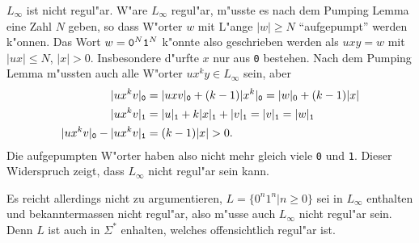 \begin{loesung}
\begin{teilaufgaben}
\item $L_\infty$ ist nicht regul"ar. W"are $L_\infty$ regul"ar,
m"usste es nach dem Pumping Lemma eine Zahl $N$ geben, so dass
W"orter $w$ mit L"ange $|w|\ge N$ ``aufgepumpt'' werden k"onnen.
Das Wort $w={\tt 0}^N{\tt 1}^N$ k"onnte also geschrieben werden
als $uxy=w$ mit $|ux|\le N$, $|x|>0$. Insbesondere d"urfte $x$ nur
aus {\tt 0} bestehen. Nach dem Pumping Lemma m"ussten auch alle
W"orter $ux^ky\in L_\infty$ sein, aber
\begin{align*}
|ux^kv|_{\tt 0}
&=
|uxv|_{\tt 0}
+
(k-1) |x^k|_{\tt 0}
=
|w|_0+(k-1)|x|
\\
|ux^kv|_{\tt 1}
&=
|u|_{\tt 1} + k|x|_{\tt 1} + |v|_{\tt 1}
=
|v|_{\tt 1}
=|w|_{\tt 1}
\\
|ux^kv|_{\tt 0}
-
|ux^kv|_{\tt 1}
&=
(k-1)|x|>0.
\end{align*}
Die aufgepumpten W"orter haben also nicht mehr gleich viele
{\tt 0} und {\tt 1}. Dieser Widerspruch zeigt, dass $L_\infty$
nicht regul"ar sein kann.

Es reicht allerdings nicht zu argumentieren, $L=\{ 0^n1^n|n \ge 0\}$
sei in $L_\infty$ enthalten und bekanntermassen nicht regul"ar,
also m"usse auch $L_\infty$ nicht regul"ar sein. Denn $L$ ist auch
in $\Sigma^*$ enhalten, welches offensichtlich regul"ar ist.
\end{teilaufgaben}
\end{loesung}


